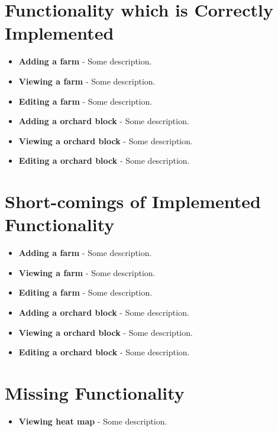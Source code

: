 \documentclass[11pt,fleqn]{book} %
\begin{document}
	\section{Functionality which is Correctly Implemented}
		\begin{itemize}
			\item\textbf{Adding a farm} -
			Some description. 
			
			\item\textbf{Viewing a farm} -
			Some description.
			
			\item\textbf{Editing a farm} -
			Some description.
			
			\item\textbf{Adding a orchard block} -
			Some description. 
			
			\item\textbf{Viewing a orchard block} -
			Some description.
			
			\item\textbf{Editing a orchard block} -
			Some description.
		\end{itemize}
	\section{Short-comings of Implemented Functionality}
		\begin{itemize}
			\item\textbf{Adding a farm} -
			Some description. 
			
			\item\textbf{Viewing a farm} -
			Some description.
			
			\item\textbf{Editing a farm} -
			Some description.
			
			\item\textbf{Adding a orchard block} -
			Some description. 
			
			\item\textbf{Viewing a orchard block} -
			Some description.
			
			\item\textbf{Editing a orchard block} -
			Some description.
		\end{itemize}
	\section{Missing Functionality}
		\begin{itemize}
			\item\textbf{Viewing heat map} -
			Some description.
		\end{itemize}
\end{document}
